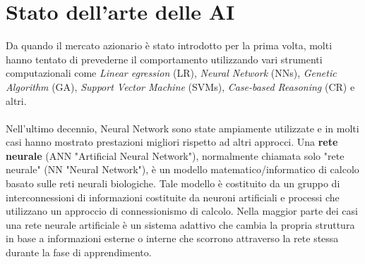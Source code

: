 \documentclass[a4paper,12pt]{report}
\begin{document}
\section{Stato dell'arte delle AI}
Da quando il mercato azionario è stato introdotto per la prima volta, molti hanno tentato di prevederne il comportamento utilizzando vari strumenti computazionali come \textit{Linear egression} (LR), \textit{Neural Network} (NNs), \textit{Genetic Algorithm} (GA), \textit{Support Vector Machine} (SVMs), \textit{Case-based Reasoning} (CR) e altri.\\~\\
Nell'ultimo decennio, Neural Network sono state ampiamente utilizzate e in molti casi hanno mostrato prestazioni migliori rispetto ad altri approcci. Una \textbf{rete neurale} (ANN "Artificial Neural Network"), normalmente chiamata solo "rete neurale" (NN "Neural Network"), è un modello matematico/informatico di calcolo basato sulle reti neurali biologiche. Tale modello è costituito da un gruppo di interconnessioni di informazioni costituite da neuroni artificiali e processi che utilizzano un approccio di connessionismo di calcolo. Nella maggior parte dei casi una rete neurale artificiale è un sistema adattivo che cambia la propria struttura in base a informazioni esterne o interne che scorrono attraverso la rete stessa durante la fase di apprendimento.\\~\\
\end{document}
